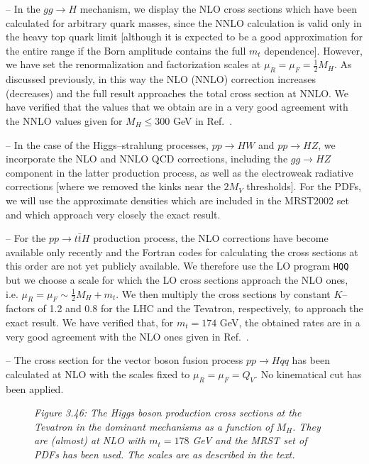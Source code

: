 -- In the $gg \to H$ mechanism, we display the NLO cross sections which have
been calculated for arbitrary quark masses, since the NNLO calculation is valid
only in the heavy top quark limit [although it is expected to be a good
approximation for the entire range if the Born amplitude contains the full
$m_t$ dependence].  However, we have set the renormalization and factorization
scales at $\mu_R\!=\!\mu_F=\! \frac{1}{2} M_H$. As discussed previously, in
this way the NLO (NNLO) correction increases (decreases) and the full result
approaches the total cross section at NNLO.  We have verified that the values
that we obtain are in a very good agreement with the NNLO values given for $M_H
\leq 300$ GeV in Ref.~\cite{ggH-NNLO-resum}.\s

-- In the case of the Higgs--strahlung processes, $pp \to HW$ and $pp \to HZ$, 
we incorporate the NLO and NNLO QCD corrections, including the $gg \to HZ$ 
component in the latter production process, as well as the electroweak 
radiative corrections [where we removed the kinks near the $2M_V$ thresholds]. 
For the PDFs, we will use the approximate densities which are included in the 
MRST2002 set and which approach very closely the exact result.\s

-- For the $pp \to t\bar{t} H$  production process, the NLO corrections have
become available only recently and the {\sc Fortran} codes for calculating 
the cross sections at this order are not yet publicly available. We therefore 
use the LO program {\tt HQQ} but we choose a scale for which the LO  
cross sections approach the NLO ones, i.e. $\mu_R=\mu_F\sim \frac{1}{2}M_H 
+ m_t$. We then multiply the cross sections by constant $K$--factors of 1.2 and 
0.8 for the LHC and the Tevatron, respectively, to approach the exact result. 
We have verified that, for $m_t=174$ GeV, the obtained rates are in a very good
agreement with the  NLO ones given in Ref.~\cite{Htt-NLO-DESY}.\s

-- The cross section for the vector boson fusion process $pp \to Hqq$ has
been calculated at NLO with the scales fixed to $\mu_R=\mu_F = Q_V$. No
kinematical cut has been applied. 

\begin{figure}[!h]
\begin{center}
\vspace*{-.7cm}
\hspace*{-1.cm}
\end{center}
\vspace*{-14.2cm}
{\it Figure 3.46: The Higgs boson production cross sections at the Tevatron  
in the dominant mechanisms as a function of $M_H$. They are (almost) at NLO
with $m_t=178$ GeV and the MRST set of PDFs has been used. The scales are
as described in the text.}
\vspace*{-.8cm}
\end{figure}

